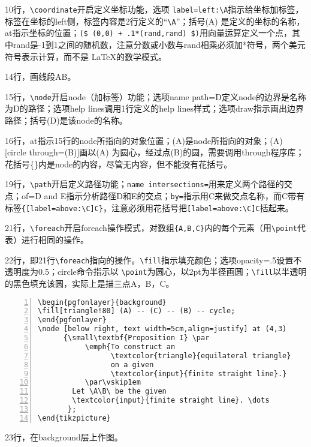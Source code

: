 \documentclass[UTF8]{ctexart}
\begin{document}
10行，\verb!\coordinate!开启定义坐标功能，选项 \verb!label=left:\A!指示给坐标加标签，标签在坐标的left侧，标签内容是2行定义的“\verb!\A!”；括号(A) 是定义的坐标的名称，at指示坐标的位置；\verb!($ (0,0) + .1*(rand,rand) $)!用向量运算定义一个点，其中rand是-1到1之间的随机数，注意分数或小数与rand相乘必须加*符号，两个美元符号表示计算，而不是 \LaTeX 的数学模式。

14行，画线段AB。

15行，\verb!\node!开启node（加标签）功能；选项name path=D定义node的边界是名称为D的路径；选项help lines调用1行定义的help lines样式；选项draw指示画出边界路径；括号(D)是该node的名称。

16行，at指示15行的node所指向的对象位置；(A)是node所指向的对象；(A) [circle through=(B)]画以(A) 为圆心，经过点(B)的圆，需要调用through程序库；花括号\{\}内是node的内容，尽管无内容，但不能没有花括号。

19行，\verb!\path!开启定义路径功能；\verb!name intersections=!用来定义两个路径的交点；of=D and E指示分析路径D和E的交点；\verb!by=!指示用C来做交点名称，而C带有标签\verb!{[label=above:\C]C}!，注意必须用花括号把\verb![label=above:\C]C!括起来。

21行，\verb!\foreach!开启foreach操作模式，对数组\verb!{A,B,C}!内的每个元素（用\verb!\point!代表）进行相同的操作。

22行，即21行\verb!\foreach!指向的操作。\verb!\fill!指示填充颜色；选项opacity=.5设置不透明度为0.5；circle命令指示以 \verb!\point!为圆心，以2pt为半径画圆；\verb!\fill!以半透明的黑色填充该圆，实际上是描三点A，B，C。

\begin{lstlisting}[name=example-3.1,numbers=left,    numberstyle=\footnotesize]
\begin{pgfonlayer}{background}
\fill[triangle!80] (A) -- (C) -- (B) -- cycle;
\end{pgfonlayer}
\node [below right, text width=5cm,align=justify] at (4,3) 
      {\small\textbf{Proposition I} \par 
           \emph{To construct an 
                 \textcolor{triangle}{equilateral triangle}
                 on a given 
                 \textcolor{input}{finite straight line}.}
           \par\vskip1em
        Let \A\B\ be the given 
        \textcolor{input}{finite straight line}. \dots
       };
\end{tikzpicture}
\end{lstlisting}

23行，在background层上作图。
\end{document}
